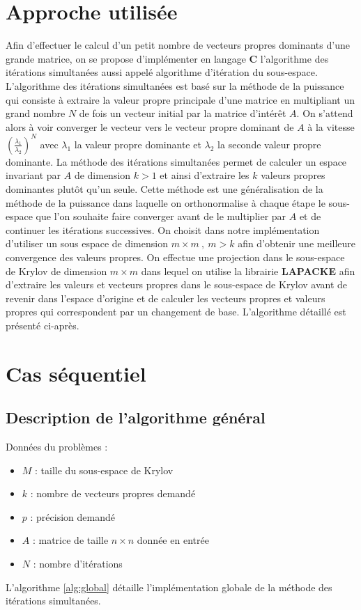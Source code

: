 \documentclass[11pt,a4paper]{article}
\begin{document}
\section{Approche utilisée}
	Afin d'effectuer le calcul d'un petit nombre de vecteurs propres dominants d'une grande matrice, on se propose d'implémenter en langage \textbf{C} l'algorithme des itérations simultanées aussi appelé algorithme d'itération du sous-espace.
	L'algorithme des itérations simultanées est basé sur la méthode de la puissance qui consiste à extraire la valeur propre principale d'une matrice en multipliant un grand nombre $N$ de fois un vecteur initial par la matrice d'intérêt $A$. On s'attend alors à voir converger le vecteur vers le vecteur propre dominant de $A$ à la vitesse $\left(\frac{\lambda_1}{\lambda_2}\right)^N$ avec $\lambda_1$ la valeur propre dominante et $\lambda_2$ la seconde valeur propre dominante.
	La méthode des itérations simultanées permet de calculer un espace invariant par $A$ de dimension $k > 1$ et ainsi d'extraire les $k$ valeurs propres dominantes plutôt qu'un seule. Cette méthode est une généralisation de la méthode de la puissance dans laquelle on orthonormalise à chaque étape le sous-espace que l'on souhaite faire converger avant de le multiplier par $A$ et de continuer les itérations successives. On choisit dans notre implémentation d'utiliser un sous espace de dimension $m\times m\:,\: m > k$ afin d'obtenir une meilleure convergence des valeurs propres. On effectue une projection dans le sous-espace de Krylov de dimension $m\times m$ dans lequel on utilise la librairie \textbf{LAPACKE} afin d'extraire les valeurs et vecteurs propres dans le sous-espace de Krylov avant de revenir dans l'espace d'origine et de calculer les vecteurs propres et valeurs propres qui correspondent par un changement de base. L'algorithme détaillé est présenté ci-après.

\section{Cas séquentiel}

	\subsection{Description de l'algorithme général}

		Données du problèmes :

		\begin{itemize}
			\item $M$ : taille du sous-espace de Krylov
			\item $k$ : nombre de vecteurs propres demandé
			\item $p$ : précision demandé
			\item $A$ : matrice de taille $n\times n$ donnée en entrée
			\item $N$ : nombre d'itérations
		\end{itemize}
		\vspace{1cm}
		L'algorithme \ref{alg:global} détaille l'implémentation globale de la méthode des itérations simultanées.
\end{document}
